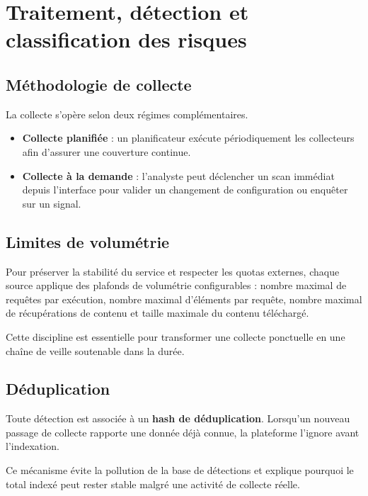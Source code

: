 \documentclass[12pt,a4paper]{report}
\begin{document}
\chapter{Traitement, détection et classification des risques}

\section{Méthodologie de collecte}

La collecte s'opère selon deux régimes complémentaires.

\begin{itemize}
  \item \textbf{Collecte planifiée} : un planificateur exécute périodiquement les collecteurs afin d'assurer une couverture continue.
  \item \textbf{Collecte à la demande} : l'analyste peut déclencher un scan immédiat depuis l'interface pour valider un changement de configuration ou enquêter sur un signal.
\end{itemize}

\section{Limites de volumétrie}

Pour préserver la stabilité du service et respecter les quotas externes, chaque source applique des plafonds de volumétrie configurables : nombre maximal de requêtes par exécution, nombre maximal d'éléments par requête, nombre maximal de récupérations de contenu et taille maximale du contenu téléchargé.

Cette discipline est essentielle pour transformer une collecte ponctuelle en une chaîne de veille soutenable dans la durée.

\section{Déduplication}

Toute détection est associée à un \textbf{hash de déduplication}. Lorsqu'un nouveau passage de collecte rapporte une donnée déjà connue, la plateforme l'ignore avant l'indexation.

Ce mécanisme évite la pollution de la base de détections et explique pourquoi le total indexé peut rester stable malgré une activité de collecte réelle.
\end{document}
